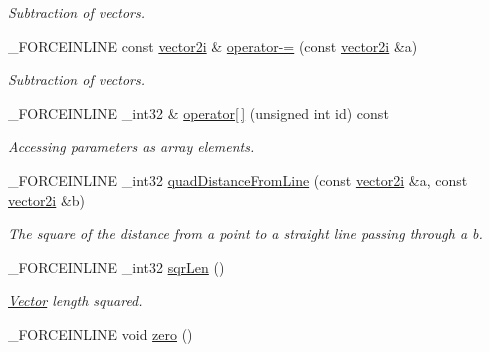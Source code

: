 \begin{DoxyCompactItemize}
\begin{DoxyCompactList}\small\item\em Subtraction of vectors. \end{DoxyCompactList}\item 
\hypertarget{classbt_1_1vector2i_a7e1f7654e2fb716a98a98b9b22b94758}{\-\_\-\-F\-O\-R\-C\-E\-I\-N\-L\-I\-N\-E const \hyperlink{classbt_1_1vector2i}{vector2i} \& \hyperlink{classbt_1_1vector2i_a7e1f7654e2fb716a98a98b9b22b94758}{operator-\/=} (const \hyperlink{classbt_1_1vector2i}{vector2i} \&a)}\label{classbt_1_1vector2i_a7e1f7654e2fb716a98a98b9b22b94758}

\begin{DoxyCompactList}\small\item\em Subtraction of vectors. \end{DoxyCompactList}\item 
\hypertarget{classbt_1_1vector2i_a95ca1f2475608f8e14a2285e1c992d13}{\-\_\-\-F\-O\-R\-C\-E\-I\-N\-L\-I\-N\-E \-\_\-int32 \& \hyperlink{classbt_1_1vector2i_a95ca1f2475608f8e14a2285e1c992d13}{operator\mbox{[}$\,$\mbox{]}} (unsigned int id) const }\label{classbt_1_1vector2i_a95ca1f2475608f8e14a2285e1c992d13}

\begin{DoxyCompactList}\small\item\em Accessing parameters as array elements. \end{DoxyCompactList}\item 
\hypertarget{classbt_1_1vector2i_a3db13ea8617e396b885d2026c9e127f6}{\-\_\-\-F\-O\-R\-C\-E\-I\-N\-L\-I\-N\-E \-\_\-int32 \hyperlink{classbt_1_1vector2i_a3db13ea8617e396b885d2026c9e127f6}{quad\-Distance\-From\-Line} (const \hyperlink{classbt_1_1vector2i}{vector2i} \&a, const \hyperlink{classbt_1_1vector2i}{vector2i} \&b)}\label{classbt_1_1vector2i_a3db13ea8617e396b885d2026c9e127f6}

\begin{DoxyCompactList}\small\item\em The square of the distance from a point to a straight line passing through a b. \end{DoxyCompactList}\item 
\hypertarget{classbt_1_1vector2i_aace5f6c0d1a96e1028d913dbb5f8457c}{\-\_\-\-F\-O\-R\-C\-E\-I\-N\-L\-I\-N\-E \-\_\-int32 \hyperlink{classbt_1_1vector2i_aace5f6c0d1a96e1028d913dbb5f8457c}{sqr\-Len} ()}\label{classbt_1_1vector2i_aace5f6c0d1a96e1028d913dbb5f8457c}

\begin{DoxyCompactList}\small\item\em \hyperlink{classbt_1_1_vector}{Vector} length squared. \end{DoxyCompactList}\item 
\hypertarget{classbt_1_1vector2i_a8a8a7f3f19c90c5c93434ebdd3dd83cc}{\-\_\-\-F\-O\-R\-C\-E\-I\-N\-L\-I\-N\-E void \hyperlink{classbt_1_1vector2i_a8a8a7f3f19c90c5c93434ebdd3dd83cc}{zero} ()}\label{classbt_1_1vector2i_a8a8a7f3f19c90c5c93434ebdd3dd83cc}


\end{DoxyCompactItemize}
